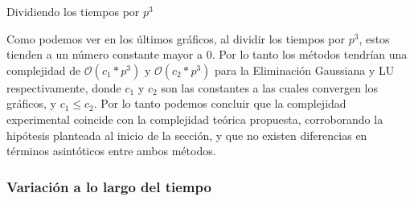 \begin{center}

    \caption{Dividiendo los tiempos por $p^3$}
\end{center}

Como podemos ver en los últimos gráficos, al dividir los tiempos por $p^3$, estos tienden a un número constante mayor a 0. Por lo tanto los métodos tendrían una complejidad
de $\mathcal{O}(c_{1}*p^3)$ y $\mathcal{O}(c_{2}*p^3)$ para la Eliminación Gaussiana y LU respectivamente, donde $c_{1}$ y $c_{2}$ son las constantes a las cuales convergen los gráficos, y $c_{1} \leq c_{2}$.
Por lo tanto podemos concluir que la complejidad experimental coincide con la complejidad teórica propuesta, corroborando la hipótesis planteada al inicio de la sección, y que no existen diferencias en términos asintóticos entre ambos métodos.


\subsubsection{Variación a lo largo del tiempo}

